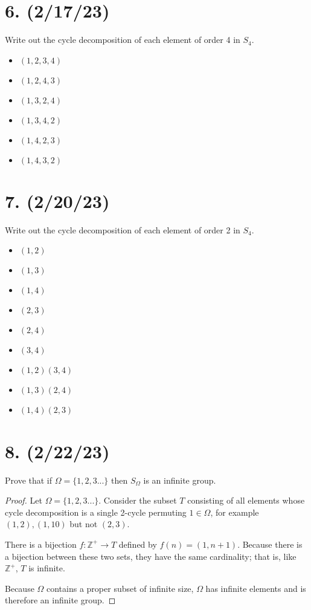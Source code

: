 \documentclass{article}
\begin{document}
\section*{6. (2/17/23)}

Write out the cycle decomposition of each element of order 4 in $S_4$.

\begin{itemize}
    \item $(1, 2, 3, 4)$
    \item $(1, 2, 4, 3)$
    \item $(1, 3, 2, 4)$
    \item $(1, 3, 4, 2)$
    \item $(1, 4, 2, 3)$
    \item $(1, 4, 3, 2)$
\end{itemize}

\section*{7. (2/20/23)}

Write out the cycle decomposition of each element of order 2 in $S_4$.

\begin{itemize}
    \item $(1, 2)$
    \item $(1, 3)$
    \item $(1, 4)$
    \item $(2, 3)$
    \item $(2, 4)$
    \item $(3, 4)$
    \item $(1, 2)(3, 4)$
    \item $(1, 3)(2, 4)$
    \item $(1, 4)(2, 3)$
\end{itemize}

\section*{8. (2/22/23)}

Prove that if $\Omega = \{1, 2, 3... \}$ then $S_\Omega$ is an infinite group.

\begin{proof}

    Let $\Omega = \{1, 2, 3... \}$. Consider the subset $T$ consisting of all elements whose cycle decomposition is a single 2-cycle permuting $1 \in \Omega$, for example $(1, 2), (1, 10)$ but not $(2, 3)$.

    There is a bijection $f: \mathbb{Z}^+ \rightarrow T$ defined by $f(n) = (1, n + 1)$. Because there is a bijection between these two sets, they have the same cardinality; that is, like $\mathbb{Z}^+$, $T$ is infinite.

    Because $\Omega$ contains a proper subset of infinite size, $\Omega$ has infinite elements and is therefore an infinite group.

\end{proof}
\end{document}
